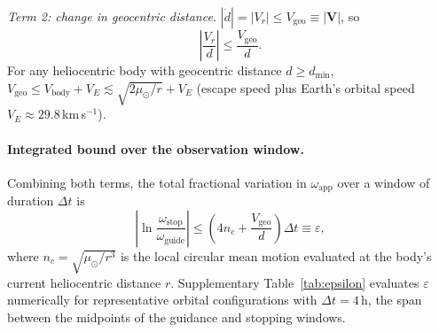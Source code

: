 \documentclass[11pt,a4paper]{article}
\begin{document}
\textit{Term 2: change in geocentric distance.}
$|\dot{d}| = |V_r| \le V_\mathrm{geo} \equiv |\mathbf{V}|$, so
\begin{equation}
  \left|\frac{V_r}{d}\right| \le \frac{V_\mathrm{geo}}{d}.
\end{equation}
For any heliocentric body with geocentric distance $d \ge d_\mathrm{min}$,
$V_\mathrm{geo} \le V_\mathrm{body} + V_E \lesssim \sqrt{2\mu_\odot/r} + V_E$
(escape speed plus Earth's orbital speed $V_E \approx 29.8$\,km\,s$^{-1}$).

\paragraph{Integrated bound over the observation window.}
Combining both terms, the total fractional variation in $\omega_\mathrm{app}$
over a window of duration $\Delta t$ is
\begin{equation}
  \left|\ln\frac{\omega_\mathrm{stop}}{\omega_\mathrm{guide}}\right|
  \le \left(4n_c + \frac{V_\mathrm{geo}}{d}\right)\Delta t
  \equiv \varepsilon,
  \label{eq:epsilon_bound}
\end{equation}
where $n_c = \sqrt{\mu_\odot/r^3}$ is the local circular mean motion evaluated
at the body's current heliocentric distance $r$.
Supplementary Table~\ref{tab:epsilon} evaluates $\varepsilon$ numerically for representative
orbital configurations with $\Delta t = 4\,\mathrm{h}$, the span between the
midpoints of the guidance and stopping windows.
\end{document}

